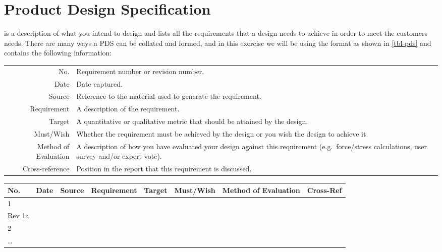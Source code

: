 \section{Product Design Specification}

 is a description of what you intend to design and lists all the requirements that a design needs to achieve in order to meet the customers needs. 
There are many ways a \ac{PDS} can be collated and formed, and in this exercise we will be using the format as shown in \cref{tbl-pds} and contains the following information:


\begin{table}
    \small
    \begin{tabular}{r p{}}
        No. & Requirement number or revision number. \\
        Date & Date captured. \\
        Source & Reference to the material used to generate the requirement. \\
        Requirement & A description of the requirement. \\
        Target & A quantitative or qualitative metric that should be attained by the design. \\
        Must/Wish & Whether the requirement must be achieved by the design or you wish the design to achieve it. \\ 
        Method of Evaluation & A description of how you have evaluated your design against this requirement (e.g.\ force/stress calculations, user survey and/or expert vote). \\
        Cross-reference & Position in the report that this requirement is discussed.
    \end{tabular}
\end{table}

\begin{table*}[h!]
    \centering
    \caption{Product Design Specification Template}
    \label{tbl-pds}
    \small
    \begin{tabular}{l l l l l l l l}
        \toprule
        No. & Date & Source & Requirement & Target & Must/Wish & Method of Evaluation & Cross-Ref \\
        \midrule
        1 & & & & \\
        Rev 1a & & & & \\
        2 & & & & \\
        \ldots & & & & \\
        \bottomrule
    \end{tabular}
    \vspace{1em}
\end{table*}

